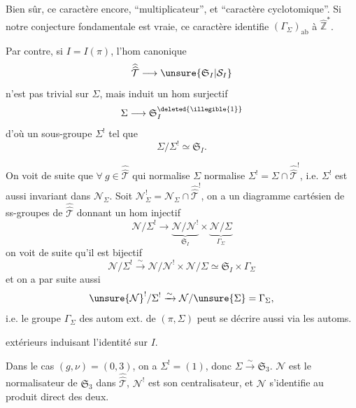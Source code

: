 
Bien sûr, ce caractère  encore, ``multiplicateur'', et ``caractère cyclotomique''.  Si notre conjecture fondamentale est vraie, ce caractère identifie $(\Gamma_\Sigma)_{\mathrm{ab}}$ à $\widehat{\mathbb Z}^{*}$.

Par contre, si $I=I(\pi)$, l'hom canonique
\[
\widehat{\widehat{\mathcal T}}\longrightarrow\unsure{\mathfrak S_I|\mathcal S_I}
\]
n'est  pas trivial sur $\Sigma$, mais induit un hom surjectif
\[
\Sigma\longrightarrow\mathfrak S_I^{\deleted{\illegible{1}}}
\]
d'où un sous-groupe $\Sigma^!$ tel que
\[
\Sigma/\Sigma^!\simeq\mathfrak S_I.
\]

On voit de suite que $\forall\ g\in\widehat{\widehat{\mathcal T}}$ qui normalise $\Sigma$ normalise $\Sigma^!=\Sigma\cap\widehat{\widehat{\mathcal T}}^!$, i.e. $\Sigma^!$ est aussi invariant dans $\mathcal N_\Sigma$.  Soit $\mathcal N_\Sigma^!=\mathcal N_\Sigma\cap\widehat{\widehat{\mathcal T}}^!$, on a un diagramme cartésien de ss-groupes de $\widehat{\widehat{\mathcal T}}$
donnant un hom injectif
\[
\mathcal N/\Sigma^!\longrightarrow
\underbrace{\mathcal N/\mathcal N^!}_{\mathfrak S_I}\times
\underbrace{\mathcal N/\Sigma}_{\Gamma_\Sigma}
\]
 on voit de suite qu'il est bijectif
\[
\mathcal N/\Sigma^!\xrightarrow{\sim}\mathcal N/\mathcal N^!\times\mathcal N/\Sigma\simeq\mathfrak S_I\times\Gamma_\Sigma
\]
et on a par suite aussi
\[
\unsure{\mathcal N}^!/\Sigma^!\xrightarrow{\sim}\mathcal N/\unsure{\Sigma}=\Gamma_\Sigma,
\]
i.e. le groupe $\Gamma_\Sigma$ des autom  ext. de $(\pi,\Sigma)$ peut se décrire aussi via les automs.


extérieurs induisant l'identité sur $I$.

Dans le cas $(g,\nu)=(0,3)$, on a $\Sigma^!=(1)$, \unsure{$\Rightarrow$} donc $\Sigma\xrightarrow{\sim}\mathfrak S_3$. $\mathcal N$ est le  normalisateur de $\mathfrak S_3$ dans $\widehat{\widehat{\mathcal T}}$, $\mathcal N^!$ \inserted{$\unsure{\xrightarrow{\sim}}\Gamma_\Sigma$} est son centralisateur, et $\mathcal N$ s'identifie au produit direct des deux.

